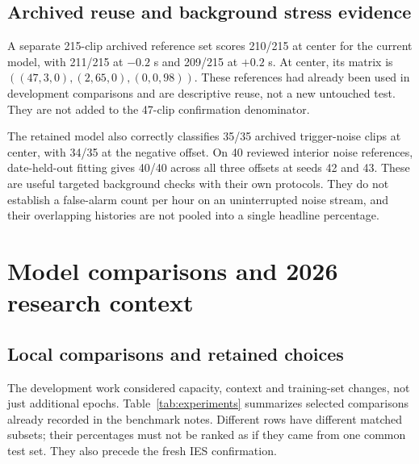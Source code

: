 \documentclass[a4paper,11pt,oneside]{article}
\begin{document}
\subsection{Archived reuse and background stress evidence}
A separate 215-clip archived reference set scores 210/215 at center for the
current model, with 211/215 at $-0.2$ s and 209/215 at $+0.2$ s. At center,
its matrix is $((47,3,0),(2,65,0),(0,0,98))$. These references had already
been used in development comparisons and are descriptive reuse, not a new
untouched test. They are not added to the 47-clip confirmation denominator.

The retained model also correctly classifies 35/35 archived trigger-noise
clips at center, with 34/35 at the negative offset. On 40 reviewed interior
noise references, date-held-out fitting gives 40/40 across all three offsets
at seeds 42 and 43. These are useful targeted background checks with their
own protocols. They do not establish a false-alarm count per hour on an
uninterrupted noise stream, and their overlapping histories are not pooled
into a single headline percentage.
\FloatBarrier

\section{Model comparisons and 2026 research context}
\subsection{Local comparisons and retained choices}
The development work considered capacity, context and training-set changes,
not just additional epochs. Table~\ref{tab:experiments} summarizes selected
comparisons already recorded in the benchmark notes. Different rows have
different matched subsets; their percentages must not be ranked as if they
came from one common test set. They also precede the fresh IES confirmation.
\end{document}

